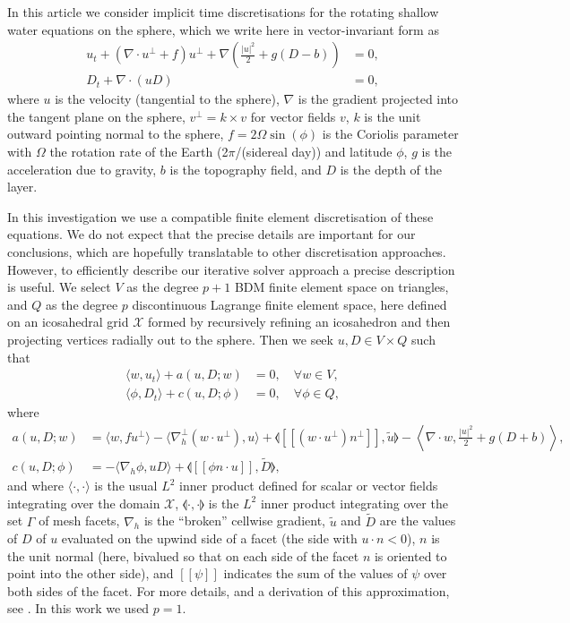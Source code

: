 \documentclass[a4paper, 12pt]{article}
\newcommand{\jump}[1]{[\![#1]\!]}
\begin{document}
In this article we consider implicit time discretisations for the
rotating shallow water equations on the sphere, which we write
here in vector-invariant form as
\begin{align}
  u_t + \left(\nabla\cdot u^\perp + f\right)u^\perp
  + \nabla\left(\frac{|u|^2}{2} + g(D-b)\right) & = 0, \\
  D_t + \nabla\cdot(uD) & = 0,
\end{align}
where $u$ is the velocity (tangential to the sphere), $\nabla$ is the
gradient projected into the tangent plane on the sphere, $v^\perp =
k\times v$ for vector fields $v$, $k$ is the unit outward pointing
normal to the sphere, $f=2\Omega \sin(\phi)$ is the Coriolis parameter
with $\Omega$ the rotation rate of the Earth (2$\pi$/(sidereal day))
and latitude $\phi$, $g$ is the acceleration due to gravity, $b$ is
the topography field, and $D$ is the depth of the layer.

In this investigation we use a compatible finite element
discretisation of these equations. We do not expect that the precise
details are important for our conclusions, which are hopefully
translatable to other discretisation approaches. However, to
efficiently describe our iterative solver approach a precise
description is useful. We select $V$ as the degree $p+1$ BDM finite
element space on triangles, and $Q$ as the degree $p$ discontinuous
Lagrange finite element space, here defined on an icosahedral grid
$\mathcal{X}$ formed by recursively refining an icosahedron and then projecting
vertices radially out to the sphere. Then we seek $u,D\in V\times Q$
such that
\begin{align}
  \label{eq:ut}
  \langle w, u_t \rangle + a(u,D;w) 
   & = 0,
  \quad \forall w \in V, \\
  \label{eq:Dt}
  \langle \phi, D_t \rangle
+ c(u,D; \phi) & =
 0, \quad \forall \phi \in Q,
\end{align}
where
\begin{align}
   a(u,D;w) 
&=
  \langle w, fu^\perp \rangle 
  - \langle \nabla_h^\perp (w\cdot u^\perp), u \rangle
  + \llangle \jump{(w\cdot u^\perp) n^\perp}, \tilde{u} \rrangle  - \left\langle \nabla\cdot w, \frac{|u|^2}{2} + g(D+b) \right\rangle, \\
  c(u,D; \phi) &=
  - \langle \nabla_h \phi, uD \rangle
  + \llangle \jump{\phi n\cdot u}, \tilde{D} \rrangle,
\end{align}
and where $\langle \cdot , \cdot \rangle$ is the usual $L^2$ inner product
defined for scalar or vector fields integrating over the domain $\mathcal{X}$,
$\llangle\cdot,\cdot \rrangle$ is the $L^2$ inner product
integrating over the set $\Gamma$ of mesh facets, $\nabla_h$ is the
``broken'' cellwise gradient, $\tilde{u}$ and $\tilde{D}$ are the
values of $D$ of $u$ evaluated on the upwind side of a facet (the side
with $u\cdot n<0$), $n$ is the unit normal (here, bivalued so that on
each side of the facet $n$ is oriented to point into the other side),
and $\jump{\psi}$ indicates the sum of the values of $\psi$ over both
sides of the facet. For more details, and a derivation of this approximation,
see \cite{gibson2019compatible}. In this work we used $p=1$.
\end{document}
